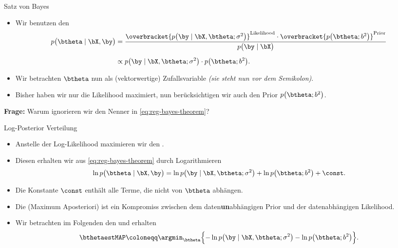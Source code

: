 \begin{frame}{Satz von Bayes}{}
	\begin{itemize}
		\item Wir benutzen den 
		\begin{equation} \label{eq:reg-bayes-theorem}
			\begin{aligned}
				p\bigl( \btheta \mid \bX, \by \bigr)
					&= \frac{\overbracket{
						p\bigl( \by \mid \bX, \btheta; \sigma^2 \bigr)
					}^{\text{Likelihood}} \cdot \overbracket{p\bigl( \btheta; b^2 \bigr)}^{\text{Prior}}}{p\bigl( \by \mid \bX \bigr)}
			\\[2mm]
					&\propto p\bigl( \by \mid \bX, \btheta; \sigma^2 \bigr) \cdot p\bigl( \btheta; b^2 \bigr).
			\end{aligned}
		\end{equation}
		\item Wir betrachten $\btheta$ nun als (vektorwertige) Zufallsvariable \textit{(sie steht nun vor dem Semikolon)}.
		\item Bisher haben wir nur die Likelihood maximiert, nun berücksichtigen wir auch den Prior $p\bigl( \btheta; b^2 \bigr)$.
	\end{itemize}
	
	\begin{boxGray}
		\textbf{Frage:} Warum ignorieren wir den Nenner in \eqref{eq:reg-bayes-theorem}?
	\end{boxGray}
\end{frame}


\begin{frame}{Log-Posterior Verteilung}{}
	\begin{itemize}
		\item Anstelle der Log-Likelihood maximieren wir den .
		\item Diesen erhalten wir aus \eqref{eq:reg-bayes-theorem} durch Logarithmieren
		\begin{equation}
			\ln p\bigl( \btheta \mid \bX, \by \bigr)
				= \ln p\bigl( \by \mid \bX, \btheta; \sigma^2 \bigr) + \ln p\bigl( \btheta; b^2 \bigr) + \const.
		\end{equation}
		\item Die Konstante $\const$ enthält alle Terme, die nicht von $\btheta$ abhängen.
		\item Die  (Maximum Aposteriori) ist ein Kompromiss zwischen dem daten\textbf{un}abhängigen Prior
			und der datenabhängigen Likelihood.
		\item Wir betrachten im Folgenden den  und erhalten
		\begin{equation} \label{eq:reg-neg-log-posterior}
			\bthetaestMAP \coloneqq \argmin_{\btheta}\Bigl\{ -\ln p\bigl( \by \mid \bX, \btheta; \sigma^2 \bigr)
				- \ln p\bigl( \btheta; b^2 \bigr) \Bigr\}.
		\end{equation}
	\end{itemize}
\end{frame}


